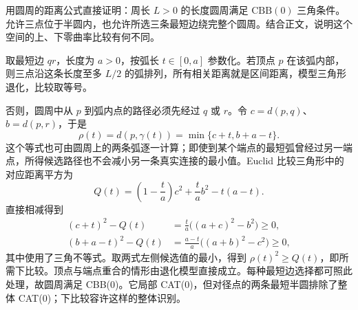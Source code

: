 \begin{optionalexercise}\label{g3:ex:circle-cbb-zero}
	用圆周的距离公式直接证明：周长 \(L>0\) 的长度圆周满足 \(\mathrm{CBB}(0)\) 三角条件。允许三点位于半圆内，也允许所选三条最短边绕完整个圆周。结合正文，说明这个空间的上、下零曲率比较有何不同。
\end{optionalexercise}
\begin{solution}
	取最短边 \(qr\)，长度为 \(a>0\)，按弧长 \(t\in[0,a]\) 参数化。若顶点 \(p\) 在该弧内部，则三点沿这条长度至多 \(L/2\) 的弧排列，所有相关距离就是区间距离，模型三角形退化，比较取等号。

	否则，圆周中从 \(p\) 到弧内点的路径必须先经过 \(q\) 或 \(r\)。令 \(c=d(p,q)\)、\(b=d(p,r)\)，于是
	\[
		\rho(t)=d(p,\gamma(t))=\min\{c+t,b+a-t\}.
	\]
	这个等式也可由圆周上的两条弧逐一计算；即使到某个端点的最短弧曾经过另一端点，所得候选路径也不会减小另一条真实连接的最小值。Euclid 比较三角形中的对应距离平方为
	\[
		Q(t)=\left(1-\frac ta\right)c^2+\frac ta b^2-t(a-t).
	\]
	直接相减得到
	\[
	\begin{aligned}
		(c+t)^2-Q(t)&=\frac ta\bigl((a+c)^2-b^2\bigr)\ge0,\\
		(b+a-t)^2-Q(t)&=\frac{a-t}{a}\bigl((a+b)^2-c^2\bigr)\ge0,
	\end{aligned}
	\]
	其中使用了三角不等式。取两式左侧候选值的最小，得到 \(\rho(t)^2\ge Q(t)\)，即所需下比较。顶点与端点重合的情形由退化模型直接成立。每种最短边选择都可照此处理，故圆周满足 CBB(0)。它局部 CAT(0)，但对径点的两条最短半圆排除了整体 CAT(0)；下比较容许这样的整体识别。
\end{solution}
